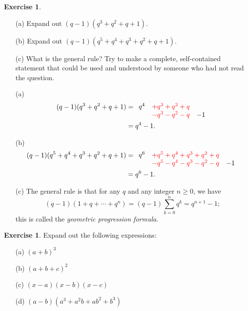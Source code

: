 \documentclass[a4paper]{book}
\newcommand{\RED}[1]{{\color{red}#1}}
\newcommand{\PURPLE}[1]{{\color{purple}#1}}
\renewcommand{\:}{\colon}
\newcommand{\DEFN}[1]{\PURPLE{\emph{#1}}}
\newcommand{\ghost}{{\tiny $\color[gray]{1}.$}}
\theoremstyle{definition}
\newtheorem{exercise}[theorem]{Exercise}
\renewenvironment{solution}{\SolutionInline}{\endSolutionInline}
\begin{document}
\begin{exercise}
 \begin{itemize}
  \item[(a)] Expand out $(q-1)(q^3+q^2+q+1)$.
  \item[(b)] Expand out $(q-1)(q^5+q^4+q^3+q^2+q+1)$.
  \item[(c)] What is the general rule?  Try to make a complete,
   self-contained statement that could be used and understood by
   someone who had not read the question.
 \end{itemize}
\end{exercise}
\begin{solution}
 \begin{itemize}
  \item[(a)] \ghost\vspace{-5ex}
   \begin{align*}
    (q-1)(q^3+q^2+q+1) &=
     \raisebox{-1.3ex}{$\begin{array}{lll}
      q^4 &\RED{+q^3+q^2+q}& \\
      &\RED{-q^3-q^2-q}&-1
     \end{array}$} \\
    &= q^4-1.
   \end{align*}
  \item[(b)] \ghost\vspace{-5ex}
   \begin{align*}
    (q-1)(q^5+q^4+q^3+q^2+q+1) &=
     \raisebox{-1.3ex}{$\begin{array}{lll}
      q^6 &\RED{+q^5+q^4+q^3+q^2+q}& \\
      &\RED{-q^5-q^4-q^3-q^2-q}&-1
     \end{array}$} \\
    &= q^6-1.
   \end{align*}
  \item[(c)] The general rule is that for any $q$ and any integer
   $n\geq 0$, we have 
   \[ (q-1)(1+q+\dotsb+q^n) = (q-1)\sum_{k=0}^nq^k = 
       q^{n+1}-1; 
   \]
   this is called the \DEFN{geometric progression formula}.
 \end{itemize}
\end{solution}
\begin{exercise}
 Expand out the following expressions:
 \begin{itemize}
  \item[(a)] $(a+b)^3$
  \item[(b)] $(a+b+c)^2$
  \item[(c)] $(x-a)(x-b)(x-c)$
  \item[(d)] $(a-b)(a^3+a^2b+ab^2+b^3)$
 \end{itemize}
\end{exercise}
\end{document}
